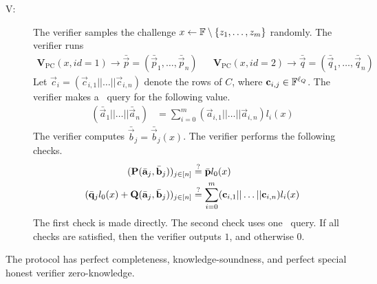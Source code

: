 \begin{description}
\item[V:] The verifier samples the challenge $x \gets \mathbb{F}\setminus\{z_1,\ldots,z_m\}$ randomly.
The verifier runs
\begin{align*}
\textbf{V}_\mathrm{PC}(x,id=1) \to \bar{\vec{p}}=(\bar{\vec{p}}_1,\ldots,\bar{\vec{p}}_n) &&
\textbf{V}_\mathrm{PC}(x,id=2) \to \bar{\vec{q}}=(\bar{\vec{q}}_1,\ldots,\bar{\vec{q}}_n)
\end{align*}
Let $\vec{c}_i = (\vec{c}_{i,1}|| \ldots || \vec{c}_{i,n} )$ denote the rows of $C$, where $\mathbf{c}_{i,j} \in \mathbb{F}^{\ell_Q}$. The verifier makes a \ILCopen\ query for the following value.
\begin{align*}
(\bar{\vec{a}}_1||\ldots||\bar{\vec{a}}_n) &= \sum_{i=0}^m ( \vec{a}_{i,1}||\ldots||\vec{a}_{i,n}) {l_i(x)}
\end{align*}
The verifier computes $\bar{\vec{b}}_j=\bar{\vec{b}}_j(x)$. The verifier performs the following checks.
\begin{align*}
(\mathbf{P}(\bar{\mathbf{a}}_j,\bar{\mathbf{b}}_j))_{j \in [n]} &\overset{?}{=} \bar{\mathbf{p}} l_0(x) \\
(\bar{\mathbf{q}}_jl_0(x)+\mathbf{Q}(\bar{\mathbf{a}}_j,\bar{\mathbf{b}}_j))_{j \in [n]} &\overset{?}{=} \sum_{i=0}^m ( \mathbf{c}_{i,1}||\ldots||\mathbf{c}_{i,n}) {l_i(x)}
\end{align*}
The first check is made directly. The second check uses one \ILCcheck\ query.
If all checks are satisfied, then the verifier outputs $1$, and otherwise $0$.
\end{description}

\begin{lemma} \label{proofmultiversion}
The protocol has perfect completeness, knowledge-soundness, and perfect special honest verifier zero-knowledge.
\end{lemma}

